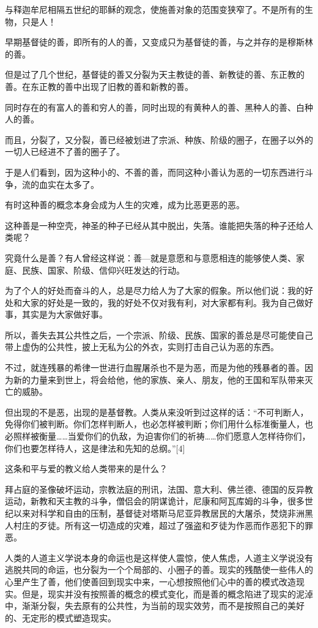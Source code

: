 与释迦牟尼相隔五世纪的耶稣的观念，使施善对象的范围变狭窄了。不是所有的生物，只是人！

早期基督徒的善，即所有的人的善，又变成只为基督徒的善，与之并存的是穆斯林的善。

但是过了几个世纪，基督徒的善又分裂为天主教徒的善、新教徒的善、东正教的善。在东正教的善中出现了旧教的善和新教的善。

同时存在的有富人的善和穷人的善，同时出现的有黄种人的善、黑种人的善、白种人的善。

而且，分裂了，又分裂，善已经被划进了宗派、种族、阶级的圈子，在圈子以外的一切人已经进不了善的圈子了。

于是人们看到，因为这种小的、不善的善，而同这种小善认为恶的一切东西进行斗争，流的血实在太多了。

有时这种善的概念本身会成为人生的灾难，成为比恶更恶的恶。

这种善是一种空壳，神圣的种子已经从其中脱出，失落。谁能把失落的种子还给人类呢？

究竟什么是善？有人曾经这样说：善—就是意愿和与意愿相连的能够使人类、家庭、民族、国家、阶级、信仰兴旺发达的行动。

为了个人的好处而奋斗的人，总是尽力给人为了大家的假象。所以他们说：我的好处和大家的好处是一致的，我的好处不仅对我有利，对大家都有利。我为自己做好事，其实是为大家做好事。

所以，善失去其公共性之后，一个宗派、阶级、民族、国家的善总是尽可能使自己带上虚伪的公共性，披上无私为公的外衣，实则打击自己认为恶的东西。

不过，就连残暴的希律一世进行血腥屠杀也不是为恶，而是为他的残暴者的善。因为新的力量来到世上，将会给他，他的家族、亲人、朋友，他的王国和军队带来灭亡的威胁。

但出现的不是恶，出现的是基督教。人类从来没听到过这样的话：“不可判断人，免得你们被判断。你们怎样判断人，也必怎样被判断；你们用什么标准衡量人，也必照样被衡量……当爱你们的仇敌，为迫害你们的祈祷……你们愿意人怎样待你们，你们也要怎样待人，这是律法和先知的总纲。”[4]

这条和平与爱的教义给人类带来的是什么？

拜占庭的圣像破坏运动，宗教法庭的刑讯，法国、意大利、佛兰德、德国的反异教运动，新教和天主教的斗争，僧侣会的阴谋诡计，尼康和阿瓦库姆的斗争，很多世纪以来对科学和自由的压制，基督徒对塔斯马尼亚异教居民的大屠杀，焚烧非洲黑人村庄的歹徒。所有这一切造成的灾难，超过了强盗和歹徒为作恶而作恶犯下的罪恶。

人类的人道主义学说本身的命运也是这样使人震惊，使人焦虑，人道主义学说没有逃脱共同的命运，也分裂为一个个局部的、小圈子的善。现实的残酷使一些伟人的心里产生了善，他们使善回到现实中来，一心想按照他们心中的善的模式改造现实。但是，现实并没有按照善的概念的模式变化，而是善的概念陷进了现实的泥淖中，渐渐分裂，失去原有的公共性，为当前的现实效劳，而不是按照自己的美好的、无定形的模式塑造现实。


